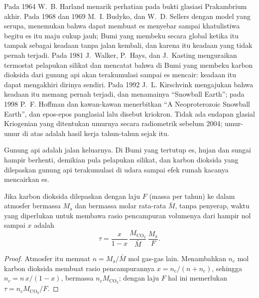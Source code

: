\begin{history}
Pada 1964 W.~B. Harland menarik perhatian pada bukti glasiasi Prakambrium akhir. Pada
1968 dan 1969 M.~I. Budyko, dan W.~D. Sellers dengan model yang serupa, menemukan bahwa
 dapat membuat es menyebar sampai khatulistiwa begitu es itu maju cukup jauh; Bumi yang
membeku secara global ketika itu tampak sebagai keadaan tanpa jalan kembali, dan karena itu keadaan yang tidak pernah terjadi.
Pada 1981 J.~Walker, P.~Hays, dan J.~Kasting menguraikan termostat pelapukan silikat dan
mencatat bahwa di Bumi yang membeku karbon dioksida dari gunung api akan terakumulasi sampai es
mencair: keadaan itu dapat mengakhiri dirinya sendiri. Pada 1992 J.~L. Kirschvink mengajukan bahwa keadaan itu memang
pernah terjadi, dan menamainya ``Snowball Earth''; pada 1998 P.~F. Hoffman dan kawan-kawan menerbitkan
``A Neoproterozoic Snowball Earth'', dan epos-epos panglasial lalu disebut kriokron. Tidak ada
endapan glasial Kriogenian yang ditentukan umurnya secara radiometrik sebelum 2004; umur-umur di atas adalah
hasil kerja tahun-tahun sejak itu.
\end{history}

Gunung api adalah jalan keluarnya. Di Bumi yang tertutup es, hujan dan sungai hampir berhenti, demikian pula pelapukan
silikat, dan karbon dioksida yang dilepaskan gunung api terakumulasi di udara
sampai efek rumah kacanya mencairkan es.

\begin{proposition}\label{prop:b2:precambrian-earth:co2}
Jika karbon dioksida dilepaskan dengan laju $F$ (massa per tahun) ke dalam atmosfer bermassa
$M_{\text{a}}$ dan bermassa molar rata-rata $\bar M$, tanpa penyerap, waktu yang diperlukan untuk membawa rasio
pencampuran volumenya dari hampir nol sampai $x$ adalah
\[
  \tau = \frac{x}{1 - x}\,\frac{M_{\mathrm{CO_2}}}{\bar M}\,\frac{M_{\text{a}}}{F} .
\]
\end{proposition}

\begin{proof}
Atmosfer itu memuat $n = M_{\text{a}}/\bar M$ mol gas-gas lain. Menambahkan $n_c$ mol
karbon dioksida membuat rasio pencampurannya $x = n_c/(n + n_c)$, sehingga $n_c = n\,x/(1 - x)$, bermassa
$n_c M_{\mathrm{CO_2}}$; dengan laju $F$ hal ini memerlukan $\tau = n_c M_{\mathrm{CO_2}}/F$.
\end{proof}

